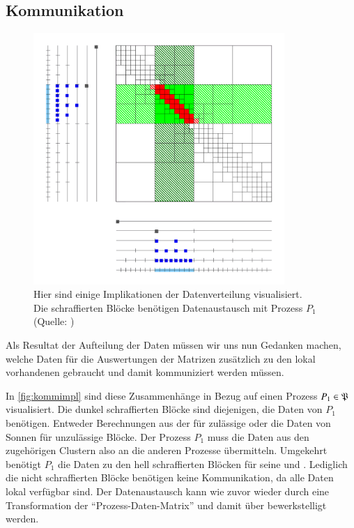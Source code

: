   \subsection{Kommunikation}
  \label{sec:komm}
    \begin{figure}[t]
      \includegraphics[width=0.85\textwidth]{img/kommimpl.png}
      \caption{Hier sind einige Implikationen der Datenverteilung visualisiert.\\
	       Die schraffierten Blöcke benötigen Datenaustausch mit Prozess $P_1$\\
	       (Quelle: \citet{h2slides})}
      \label{fig:kommimpl}
    \end{figure}

    Als Resultat der Aufteilung der Daten müssen wir uns nun Gedanken machen, welche Daten für die Auswertungen der Matrizen zusätzlich zu den lokal vorhandenen gebraucht und damit kommuniziert werden 
    müssen.
    
    In \autoref{fig:kommimpl} sind diese Zusammenhänge in Bezug auf einen Prozess $P_1 \in \mathfrak{P}$ visualisiert. Die dunkel schraffierten Blöcke sind diejenigen, die Daten von $P_1$ benötigen. 
    Entweder Berechnungen aus der \vorw für zulässige oder die Daten von Sonnen für unzulässige Blöcke. Der Prozess $P_1$ muss die Daten aus den zugehörigen Clustern also an die anderen Prozesse 
    übermitteln. Umgekehrt benötigt $P_1$ die Daten zu den hell schraffierten Blöcken für seine \koppl und \ruckw. Lediglich die nicht schraffierten Blöcke benötigen keine Kommunikation, da alle
    Daten lokal verfügbar sind. Der Datenaustausch kann wie zuvor wieder durch eine Transformation der ``Prozess-Daten-Matrix'' und damit über  bewerkstelligt werden. 
    
